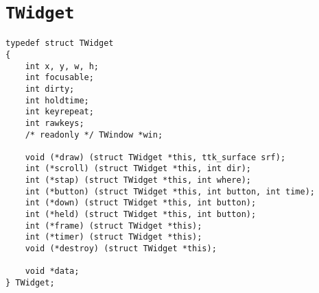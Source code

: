 \documentclass[12pt,letterpaper]{report}
\let\ttt\tt
\def\tt{\def\_{{\ttt\char`\_}}\ttt}
\def\texttt#1{{\tt #1}}
\begin{document}
\section{\texttt{TWidget}}
\begin{verbatim}
typedef struct TWidget
{
    int x, y, w, h;
    int focusable;
    int dirty;
    int holdtime;
    int keyrepeat;
    int rawkeys;
    /* readonly */ TWindow *win;
    
    void (*draw) (struct TWidget *this, ttk_surface srf);
    int (*scroll) (struct TWidget *this, int dir);
    int (*stap) (struct TWidget *this, int where);
    int (*button) (struct TWidget *this, int button, int time);
    int (*down) (struct TWidget *this, int button);
    int (*held) (struct TWidget *this, int button);
    int (*frame) (struct TWidget *this);
    int (*timer) (struct TWidget *this);
    void (*destroy) (struct TWidget *this);

    void *data;
} TWidget;
\end{verbatim}
\vskip6pt\relax
\end{document}
